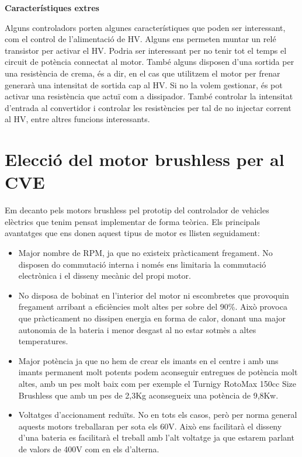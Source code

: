  \textbf{Característiques extres}
 
 Alguns controladors porten algunes característiques que poden ser interessant, com el control de l'alimentació de HV. Alguns ens permeten muntar un relé transistor per activar el HV. Podria ser interessant per no tenir tot el temps el circuit de potència connectat al motor. També alguns disposen d'una sortida per una resistència de crema, és a dir, en el cas que utilitzem el motor per frenar generarà una intensitat de sortida cap al HV. Si no la volem gestionar, és pot activar una resistència que actuï com a dissipador. També controlar la intensitat d'entrada al convertidor i controlar les resistències per tal de no injectar corrent al HV, entre altres funcions interessants. 

 \section{Elecció del motor brushless per al CVE}

Em decanto pels motors brushless pel prototip del controlador de vehicles elèctrics que tenim pensat implementar de forma teòrica. Els principals avantatges que ens donen aquest tipus de motor es llisten seguidament:

\begin{itemize}
    \item Major nombre de RPM, ja que no existeix pràcticament fregament. No disposen do commutació interna i només ens limitaria la commutació electrònica i el disseny mecànic del propi motor.
    \item No disposa de bobinat en l'interior del motor ni escombretes que provoquin fregament arribant a eficiències molt altes per sobre del 90\%. Això provoca que pràcticament no dissipen energia en forma de calor, donant una major autonomia de la bateria i menor desgast al no estar sotmès a altes temperatures.
    \item Major potència ja que no hem de crear els imants en el centre i amb uns imants permanent molt potents podem aconseguir entregues de potència molt altes, amb un pes molt baix com per exemple el Turnigy RotoMax 150cc Size Brushless que amb un pes de 2,3Kg aconsegueix una potència de 9,8Kw.
    \item Voltatges d'accionament reduïts. No en tots els casos, però per norma general aquests motors treballaran per sota els 60V. Això ens facilitarà el disseny d'una bateria es facilitarà el treball amb l'alt voltatge ja que estarem parlant de valors de 400V com en els d'alterna.
\end{itemize}

